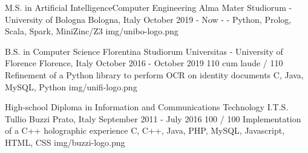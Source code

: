 
\begin{cventries}

  \logocventry
    {M.S. in Artificial Intelligence{\enskip\cdotp\enskip}Computer Engineering}
    {Alma Mater Studiorum - University of Bologna}
    {Bologna, Italy}
    {October 2019 - Now}
    {
      \cvedu
        {-}
        {-}
        {Python, Prolog, Scala, Spark, MiniZinc/Z3}
    }
    {img/unibo-logo.png}

  \logocventry
    {B.S. in Computer Science}
    {Florentina Studiorum Universitas - University of Florence}
    {Florence, Italy}
    {October 2016 - October 2019}
    {
      \cvedu
        {110 cum laude / 110}
        {Refinement of a Python library to perform OCR on identity documents}
        {C, Java, MySQL, Python}
    }
    {img/unifi-logo.png}

  \logocventry
    {High-school Diploma in Information and Communications Technology}
    {I.T.S. Tullio Buzzi}
    {Prato, Italy}
    {September 2011 - July 2016}
    {
      \cvedu
        {100 / 100}
        {Implementation of a C++ holographic experience}
        {C, C++, Java, PHP, MySQL, Javascript, HTML, CSS}
    }
    {img/buzzi-logo.png}

\end{cventries}
